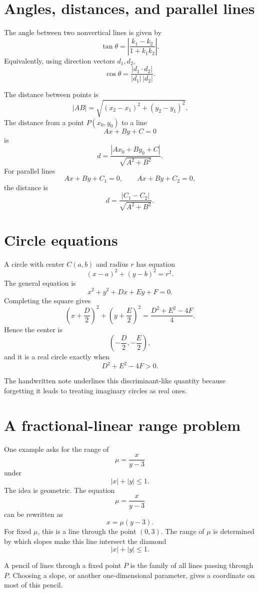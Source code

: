 \section{Angles, distances, and parallel lines}

The angle between two nonvertical lines is given by
\[
  \tan\theta=\left|\frac{k_1-k_2}{1+k_1k_2}\right|.
\]
Equivalently, using direction vectors \(d_1,d_2\),
\[
  \cos\theta=\frac{|d_1\cdot d_2|}{|d_1|\,|d_2|}.
\]

The distance between points is
\[
  |AB|=\sqrt{(x_2-x_1)^2+(y_2-y_1)^2}.
\]
The distance from a point \(P(x_0,y_0)\) to a line
\[
  Ax+By+C=0
\]
is
\[
  d=\frac{|Ax_0+By_0+C|}{\sqrt{A^2+B^2}}.
\]
For parallel lines
\[
  Ax+By+C_1=0,\qquad Ax+By+C_2=0,
\]
the distance is
\[
  d=\frac{|C_1-C_2|}{\sqrt{A^2+B^2}}.
\]

\section{Circle equations}

A circle with center \(C(a,b)\) and radius \(r\) has equation
\[
  (x-a)^2+(y-b)^2=r^2.
\]
The general equation is
\[
  x^2+y^2+Dx+Ey+F=0.
\]
Completing the square gives
\[
  \left(x+\frac D2\right)^2+\left(y+\frac E2\right)^2
  =\frac{D^2+E^2-4F}{4}.
\]
Hence the center is
\[
  \left(-\frac D2,-\frac E2\right),
\]
and it is a real circle exactly when
\[
  D^2+E^2-4F>0.
\]

The handwritten note underlines this discriminant-like quantity because forgetting it leads to treating imaginary circles as real ones.

\section{A fractional-linear range problem}

One example asks for the range of
\[
  \mu=\frac{x}{y-3}
\]
under
\[
  |x|+|y|\le1.
\]
The idea is geometric.  The equation
\[
  \mu=\frac{x}{y-3}
\]
can be rewritten as
\[
  x=\mu(y-3).
\]
For fixed \(\mu\), this is a line through the point \((0,3)\).  The range of \(\mu\) is determined by which slopes make this line intersect the diamond
\[
  |x|+|y|\le1.
\]

\begin{definition}
A pencil of lines through a fixed point \(P\) is the family of all lines passing through \(P\).  Choosing a slope, or another one-dimensional parameter, gives a coordinate on most of this pencil.
\end{definition}

